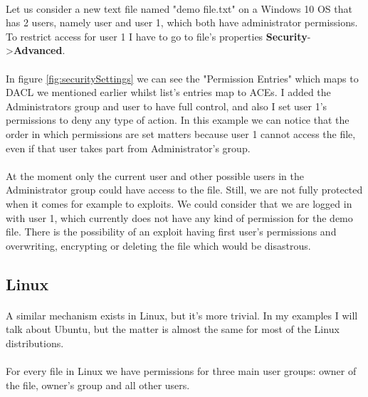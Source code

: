 	\paragraph{}
	Let us consider a new text file named "demo file.txt" on a Windows 10 OS that has 2 users, namely user and user 1, which both have administrator permissions. To restrict access for user 1 I have to go to file's properties \textbf{Security}-\textgreater\textbf{Advanced}.
	
	\paragraph{}
	In figure \ref{fig:securitySettings} we can see the "Permission Entries" which maps to DACL we mentioned earlier whilst list's entries map to ACEs. I added the Administrators group and user to have full control, and also I set user 1's permissions to deny any type of action. In this example we can notice that the order in which permissions are set matters because user 1 cannot access the file, even if that user takes part from Administrator's group. 
	
	\paragraph{}
	At the moment only the current user and other possible users in the Administrator group could have access to the file. Still, we are not fully protected when it comes for example to exploits. We could consider that we are logged in with user 1, which currently does not have any kind of permission for the demo file. There is the possibility of an exploit having first user's permissions and overwriting, encrypting or deleting the file which would be disastrous.
	
	\subsection{Linux}
	\paragraph{}
	A similar mechanism exists in Linux, but it's more trivial. In my examples I will talk about Ubuntu, but the matter is almost the same for most of the Linux distributions.
	
	\paragraph{}
	For every file in Linux we have permissions for three main user groups: owner of the file, owner's group and all other users. 
	
